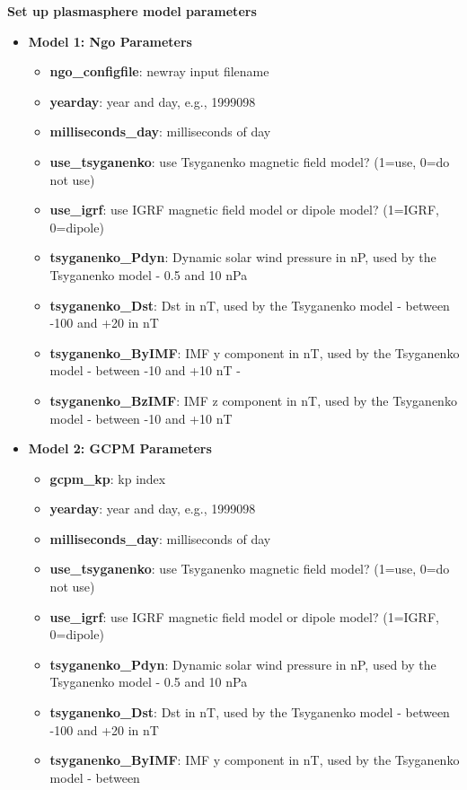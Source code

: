 \documentclass[10pt]{article}
\begin{document}
{\bf Set up plasmasphere model parameters}
\begin{itemize}
  \item{\bf Model 1: Ngo Parameters}
    \begin{itemize}
    \item{\bf ngo\_configfile}:
      newray input filename
    \item{\bf yearday}:
      year and day, e.g., 1999098
    \item{\bf milliseconds\_day}:
      milliseconds of day
    \item{\bf use\_tsyganenko}:
      use Tsyganenko magnetic field model? (1=use, 0=do not use)
    \item{\bf use\_igrf}:
      use IGRF magnetic field model or dipole model? (1=IGRF, 0=dipole)
    \item{\bf tsyganenko\_Pdyn}:
      Dynamic solar wind pressure in nP, used by the Tsyganenko model
      - 0.5 and 10 nPa
    \item{\bf tsyganenko\_Dst}:
      Dst in nT, used by the Tsyganenko model - between -100 and +20 in nT
    \item{\bf tsyganenko\_ByIMF}:
      IMF y component in nT, used by the Tsyganenko model - between
      -10 and +10 nT -
    \item{\bf tsyganenko\_BzIMF}:
      IMF z component in nT, used by the Tsyganenko model - between
      -10 and +10 nT
    \end{itemize}
  \item{\bf Model 2:  GCPM Parameters}
    \begin{itemize}
    \item{\bf gcpm\_kp}:
      kp index
    \item{\bf yearday}:
      year and day, e.g., 1999098
    \item{\bf milliseconds\_day}:
      milliseconds of day
    \item{\bf use\_tsyganenko}:
      use Tsyganenko magnetic field model? (1=use, 0=do not use)
    \item{\bf use\_igrf}:
      use IGRF magnetic field model or dipole model? (1=IGRF, 0=dipole)
    \item{\bf tsyganenko\_Pdyn}:
      Dynamic solar wind pressure in nP, used by the Tsyganenko model
      - 0.5 and 10 nPa
    \item{\bf tsyganenko\_Dst}:
      Dst in nT, used by the Tsyganenko model - between -100 and +20 in nT
    \item{\bf tsyganenko\_ByIMF}:
      IMF y component in nT, used by the Tsyganenko model - between

\end{itemize}
\end{itemize}
\end{document}
